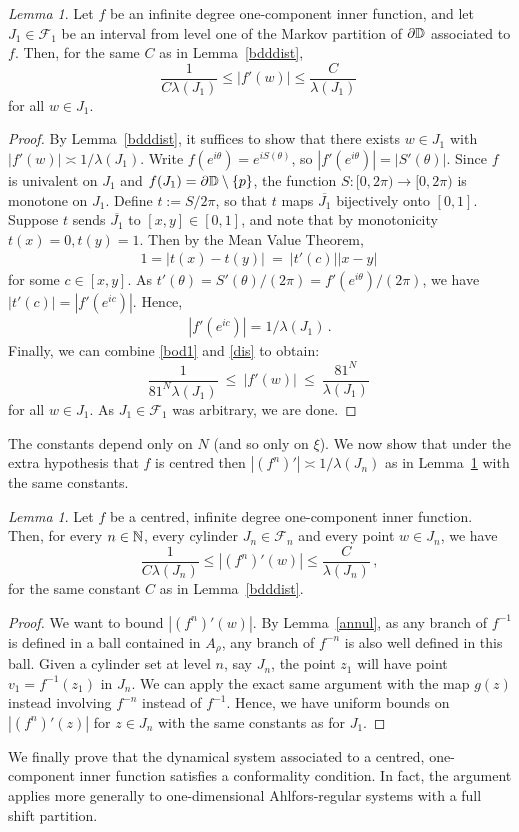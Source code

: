 \documentclass[11pt,reqno]{amsart}
\newcommand{\N}{{\Bbb N}}
\newcommand{\D}{{\Bbb D}}
\newcommand{\0}{\mathbf{0}}
\newtheorem{lemma}{Lemma}
\theoremstyle{remark}
\numberwithin{equation}{section}
\newtheorem{lemma}[theorem]{Lemma}
\theoremstyle{remark}
\numberwithin{equation}{section}
\begin{document}
\begin{lemma}\label{kd} Let $f$ be an infinite degree one-component inner function, and let $J_1 \in \mathcal{F}_1$ be an interval from level one of the Markov partition of $\partial \D$ associated to $f$. Then, for the same $C$ as in Lemma~\ref{bdddist},
    $$
\frac{1}{C \lambda(J_1)} \leq |f'(w)| \leq \frac{C}{\lambda(J_1)} \, 
$$
for all $w \in J_1$.
\end{lemma}
\begin{proof}
By Lemma~\ref{bdddist}, it suffices to show that there exists $w \in J_1$ with $|f'(w)| \asymp 1/\lambda(J_1)$.
Write $f(e^{i\theta}) = e^{iS(\theta)}$, so $|f'(e^{i\theta})| = |S'(\theta)|$. Since $f$ is univalent on $J_1$ and $f(J_1) = \partial \D \setminus \{p\}$, the function $S: [0,2\pi) \to [0,2\pi)$ is monotone on $J_1$. Define $t := S/2\pi$, so that $t$ maps $\overline{J_1}$ bijectively onto $[0,1]$. Suppose $t$ sends $\overline{J_1}$ to $[x,y] \in [0,1]$, and note that by monotonicity $t(x)=0, t(y)=1$.
Then by the Mean Value Theorem,
\begin{eqnarray}\label{mvt1}
   1=|t(x)-t(y)| \: = \: |t'(c)||x-y| \, 
\end{eqnarray}
for some $c \in [x,y]$.  As $t'(\theta) = S'(\theta)/(2\pi) = f'(e^{i\theta})/(2\pi)$, we have $|t'(c)|=|f'(e^{ic})|$. Hence, 
\begin{eqnarray}\label{dis}
    |f'(e^{ic})|=1/\lambda(J_1) \, .
\end{eqnarray}
Finally, we can combine \eqref{bod1} and \eqref{dis} to obtain:
$$
\frac{1}{81^N \lambda(J_1)}\: \leq \: |f'(w)| \: \leq  \: \frac{ 81^N}{\lambda(J_1)} \, 
$$
for all $w \in J_1$.  As $J_1 \in \mathcal{F}_1$ was arbitrary, we are done.
\end{proof}
 The constants depend only on $N$ (and so only on $\xi$).
 We now show that under the extra hypothesis that $f$ is centred then  $|(f^n)'| \asymp 1/ \lambda(J_n)$ as in Lemma~\ref{kd} with the same constants.
\begin{lemma}\label{kdn}
Let $f$ be a centred, infinite degree one-component inner function. Then, for every $n \in \N$, every cylinder $J_n\in \mathcal{F}_n$ and every point $w \in J_n$, we have
   $$
\frac{1}{C \lambda(J_n)} \leq |(f^n)'(w)| \leq \frac{ C}{\lambda(J_n)} \, ,
$$
for the same constant $C$ as in Lemma~\ref{bdddist}.
\end{lemma}
\begin{proof}
We want to bound $|(f^n)'(w)|$.
By Lemma~\ref{annul}, as any branch of $f^{-1}$ is defined in a ball contained in $ A_{\rho}$, any branch of $f^{-n}$ is also well defined in this ball. Given a cylinder set at level $n$, say $J_n$, the point $z_1$ will have point $v_1 = f^{-1}(z_1)$ in $J_n$. We can apply the exact same argument with the map $g(z)$ instead involving $f^{-n}$ instead of $f^{-1}$. Hence, we have uniform bounds on $|(f^n)'(z)|$ for $z \in J_n$ with the same constants as for $J_1$.
\end{proof}
We finally prove that the dynamical system associated to  a centred, one-component inner function satisfies a conformality condition. In fact, the argument applies more generally to one-dimensional Ahlfors-regular systems with a full shift partition.
\end{document}
